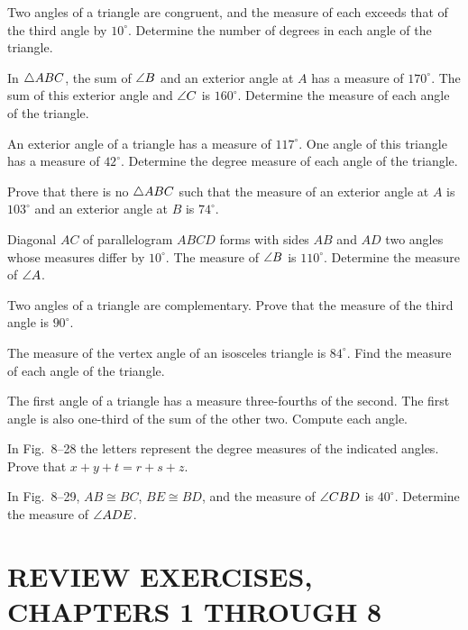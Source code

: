 \documentclass[11pt]{book}
\begin{document}
\begin{exlist}
\item Two angles of a triangle are congruent, and the measure of each exceeds
  that of the third angle by $10^\circ$. Determine the number of degrees in
  each angle of the triangle.
\item In $\triangle ABC$, the sum of $\angle B$ and an exterior angle at $A$ has a
  measure of $170^\circ$. The sum of this exterior angle and $\angle C$ is
  $160^\circ$. Determine the measure of each angle of the triangle.
\item An exterior angle of a triangle has a measure of $117^\circ$. One angle
  of this triangle has a measure of $42^\circ$. Determine the degree measure
  of each angle of the triangle.
\item Prove that there is no $\triangle ABC$ such that the measure of an exterior
  angle at $A$ is $103^\circ$ and an exterior angle at $B$ is $74^\circ$.
\item Diagonal $AC$ of parallelogram $ABCD$ forms with sides $AB$ and $AD$ two
  angles whose measures differ by $10^\circ$. The measure of $\angle B$ is
  $110^\circ$. Determine the measure of $\angle A$.
\item Two angles of a triangle are complementary. Prove that the measure of
  the third angle is $90^\circ$.
\item The measure of the vertex angle of an isosceles triangle is $84^\circ$.
  Find the measure of each angle of the triangle.
\item The first angle of a triangle has a measure three-fourths of the second.
  The first angle is also one-third of the sum of the other two. Compute each
  angle.
\item In Fig.~8--28 the letters represent the degree measures of the indicated
  angles. Prove that $x + y + t = r + s + z$.
\exfig{\FIGVIIITWENTYEIGHT}
\item In Fig.~8--29, $AB \cong BC$, $BE \cong BD$, and the measure of
  $\angle CBD$ is $40^\circ$. Determine the measure of $\angle ADE$.
\exfig{\FIGVIIITWENTYNINE}
\end{exlist}

\section*{REVIEW EXERCISES,\\CHAPTERS 1 THROUGH 8}
\end{document}
